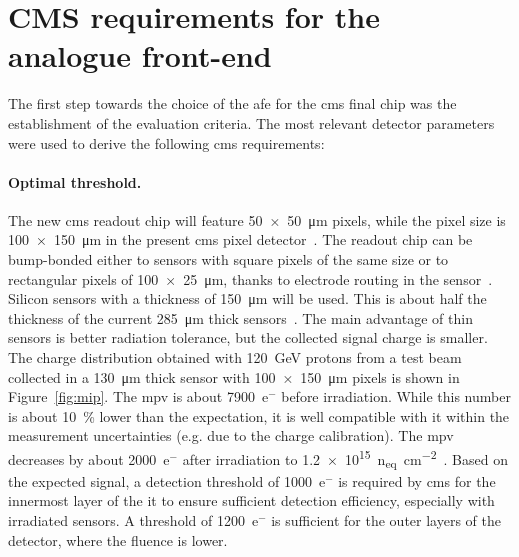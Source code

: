 \section{CMS requirements for the analogue front-end}
\label{sec:requirements}

The first step towards the choice of the \gls{afe} for the \gls{cms} final chip was the establishment of the evaluation criteria. The most relevant detector parameters were used to derive the following \gls{cms} requirements:

\paragraph{Optimal threshold.}
The new \gls{cms} readout chip will feature \SI[product-units = power]{50x50}{\micro\meter} pixels, while the pixel size is \SI[product-units = power]{100x150}{\micro\meter} in the present \gls{cms} pixel detector~\citep{p1_tdr}. The readout chip can be bump-bonded either to sensors with square pixels of the same size or to rectangular pixels of \SI[product-units = power]{100x25}{\micro\meter}, thanks to electrode routing in the sensor~\citep{p2_tdr}. Silicon sensors with a thickness of \SI{150}{\micro\meter} will be used. This is about half the thickness of the current \SI{285}{\micro\meter} thick sensors~\citep{p1_tdr}. The main advantage of thin sensors is better radiation tolerance, but the collected signal charge is smaller. The charge distribution obtained with \SI{120}{\giga\electronvolt} protons from a test beam collected in a \SI{130}{\micro\meter} thick sensor with \SI[product-units = power]{100x150}{\micro\meter} pixels is shown in Figure~\ref{fig:mip}. The \gls{mpv} is about \num{7900}~e${^{-}}$ before irradiation. While this number is about \SI{10}{\percent} lower than the expectation, it is well compatible with it within the measurement uncertainties (e.g. due to the charge calibration). The \gls{mpv} decreases by about \num{2000}~e${^{-}}$ after irradiation to \SI{1.2e15}{n_{eq}\per\centi\meter\squared}~\citep{p2_tdr}. Based on the expected signal, a detection threshold of \num{1000}~e${^{-}}$ is required by \gls{cms} for the innermost layer of the \gls{it} to ensure sufficient detection efficiency, especially with irradiated sensors. A threshold of \num{1200}~e${^{-}}$ is sufficient for the outer layers of the detector, where the fluence is lower. 

